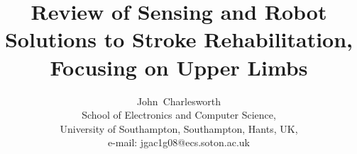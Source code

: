 \documentclass[journal]{IEEEtran}
\begin{document}
%
\title{Review of Sensing and Robot Solutions to Stroke Rehabilitation, Focusing on Upper Limbs} %
%
%
%

\author{John~Charlesworth \\ School of Electronics and Computer Science, \\
University of Southampton, Southampton, Hants,
UK, \\ e-mail: jgac1g08@ecs.soton.ac.uk}%


% 
%





% 
\end{document}
